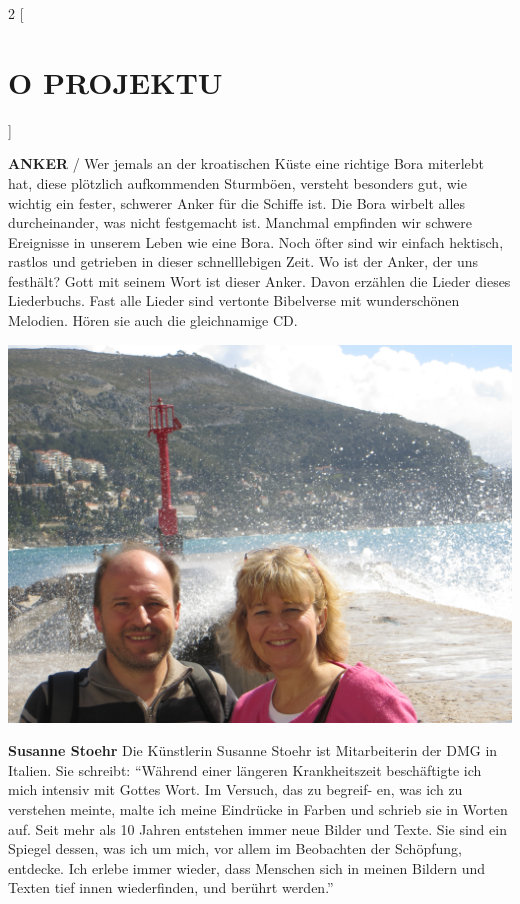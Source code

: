\documentclass[a4paper,twoside, svgnames]{article}
\begin{document}
\newpage
\begin{multicols}{2}
[
\section*{O PROJEKTU}
]
    \begin{onehalfspacing}
        \begin{justify}
\textbf{ANKER} / Wer jemals an der kroatischen Küste eine richtige Bora miterlebt hat, diese plötzlich aufkommenden Sturmböen, versteht besonders gut, wie wichtig ein fester, schwerer Anker
für die Schiffe ist. Die Bora wirbelt alles durcheinander, was nicht festgemacht ist.
Manchmal empfinden wir schwere Ereignisse in unserem Leben wie eine Bora. Noch öfter
sind wir einfach hektisch, rastlos und getrieben in dieser schnelllebigen Zeit.
Wo ist der Anker, der uns festhält? Gott mit seinem Wort ist dieser Anker. Davon erzählen die Lieder dieses Liederbuchs. Fast alle Lieder
sind vertonte Bibelverse mit wunderschönen Melodien.
Hören sie auch die gleichnamige CD.

\begin{center}
\includegraphics[width=\linewidth]{images/IMG_1216}
\end{center}
\textbf{Susanne Stoehr} Die Künstlerin Susanne Stoehr ist Mitarbeiterin der DMG in Italien. Sie schreibt: “Während einer
längeren Krankheitszeit beschäftigte ich mich intensiv mit Gottes Wort. Im Versuch, das zu begreif-
en, was ich zu verstehen meinte, malte ich meine Eindrücke in Farben und schrieb sie in Worten
auf. Seit mehr als 10 Jahren entstehen immer neue Bilder und Texte. Sie sind ein Spiegel dessen,
was ich um mich, vor allem im Beobachten der Schöpfung, entdecke. Ich erlebe immer wieder, dass
Menschen sich in meinen Bildern und Texten tief innen wiederfinden, und berührt werden.”


\end{justify}
\end{onehalfspacing}
\end{multicols}
\end{document}
